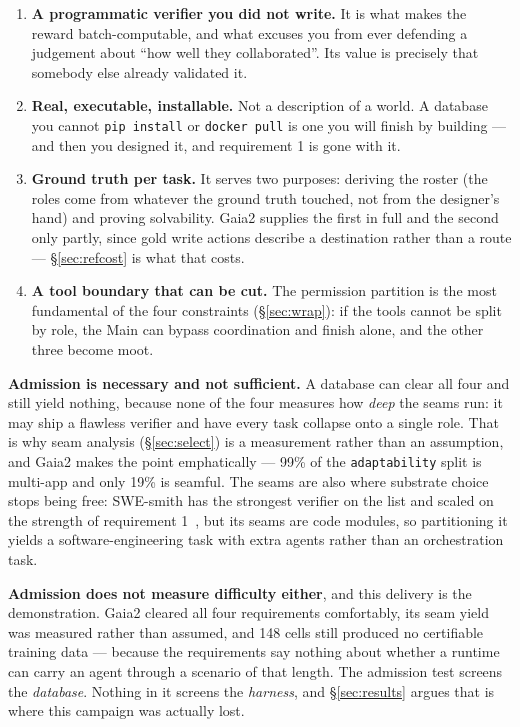 \documentclass[11pt,a4paper]{article}
\begin{document}
\begin{enumerate}[leftmargin=*,itemsep=0.15em]
\item \textbf{A programmatic verifier you did not write.} It is what makes the reward batch-computable, and what excuses you from ever defending a judgement about ``how well they collaborated''. Its value is precisely that somebody else already validated it.
\item \textbf{Real, executable, installable.} Not a description of a world. A database you cannot \texttt{pip install} or \texttt{docker pull} is one you will finish by building --- and then you designed it, and requirement 1 is gone with it.
\item \textbf{Ground truth per task.} It serves two purposes: deriving the roster (the roles come from whatever the ground truth touched, not from the designer's hand) and proving solvability. Gaia2 supplies the first in full and the second only partly, since gold write actions describe a destination rather than a route --- \S\ref{sec:refcost} is what that costs.
\item \textbf{A tool boundary that can be cut.} The permission partition is the most fundamental of the four constraints (\S\ref{sec:wrap}): if the tools cannot be split by role, the Main can bypass coordination and finish alone, and the other three become moot.
\end{enumerate}

\textbf{Admission is necessary and not sufficient.} A database can clear all four and still yield nothing, because none of the four measures how \emph{deep} the seams run: it may ship a flawless verifier and have every task collapse onto a single role. That is why seam analysis (\S\ref{sec:select}) is a measurement rather than an assumption, and Gaia2 makes the point emphatically --- 99\% of the \texttt{adaptability} split is multi-app and only 19\% is seamful. The seams are also where substrate choice stops being free: SWE-smith has the strongest verifier on the list and scaled on the strength of requirement 1~\cite{yang2025swesmith}, but its seams are code modules, so partitioning it yields a software-engineering task with extra agents rather than an orchestration task.

\textbf{Admission does not measure difficulty either}, and this delivery is the demonstration. Gaia2 cleared all four requirements comfortably, its seam yield was measured rather than assumed, and 148 cells still produced no certifiable training data --- because the requirements say nothing about whether a runtime can carry an agent through a scenario of that length. The admission test screens the \emph{database}. Nothing in it screens the \emph{harness}, and \S\ref{sec:results} argues that is where this campaign was actually lost.
\end{document}
